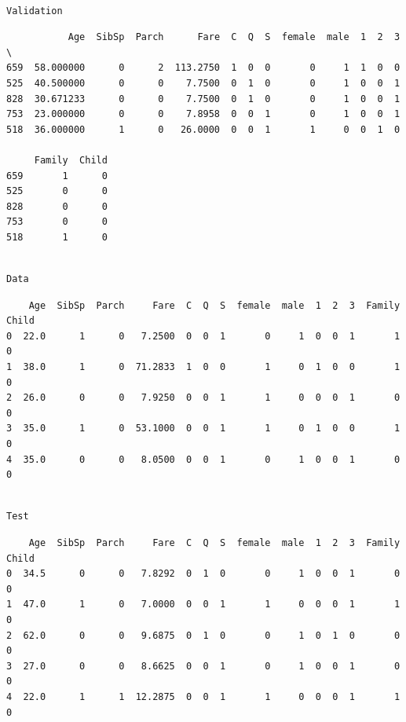 \documentclass[11pt]{article}
\begin{document}
    
    \begin{Verbatim}[commandchars=\\\{\}]

Validation

    \end{Verbatim}

    
    \begin{verbatim}
           Age  SibSp  Parch      Fare  C  Q  S  female  male  1  2  3  \
659  58.000000      0      2  113.2750  1  0  0       0     1  1  0  0   
525  40.500000      0      0    7.7500  0  1  0       0     1  0  0  1   
828  30.671233      0      0    7.7500  0  1  0       0     1  0  0  1   
753  23.000000      0      0    7.8958  0  0  1       0     1  0  0  1   
518  36.000000      1      0   26.0000  0  0  1       1     0  0  1  0   

     Family  Child  
659       1      0  
525       0      0  
828       0      0  
753       0      0  
518       1      0  
    \end{verbatim}

    
    \begin{Verbatim}[commandchars=\\\{\}]

Data

    \end{Verbatim}

    
    \begin{verbatim}
    Age  SibSp  Parch     Fare  C  Q  S  female  male  1  2  3  Family  Child
0  22.0      1      0   7.2500  0  0  1       0     1  0  0  1       1      0
1  38.0      1      0  71.2833  1  0  0       1     0  1  0  0       1      0
2  26.0      0      0   7.9250  0  0  1       1     0  0  0  1       0      0
3  35.0      1      0  53.1000  0  0  1       1     0  1  0  0       1      0
4  35.0      0      0   8.0500  0  0  1       0     1  0  0  1       0      0
    \end{verbatim}

    
    \begin{Verbatim}[commandchars=\\\{\}]

Test

    \end{Verbatim}

    
    \begin{verbatim}
    Age  SibSp  Parch     Fare  C  Q  S  female  male  1  2  3  Family  Child
0  34.5      0      0   7.8292  0  1  0       0     1  0  0  1       0      0
1  47.0      1      0   7.0000  0  0  1       1     0  0  0  1       1      0
2  62.0      0      0   9.6875  0  1  0       0     1  0  1  0       0      0
3  27.0      0      0   8.6625  0  0  1       0     1  0  0  1       0      0
4  22.0      1      1  12.2875  0  0  1       1     0  0  0  1       1      0
    \end{verbatim}
\end{document}
